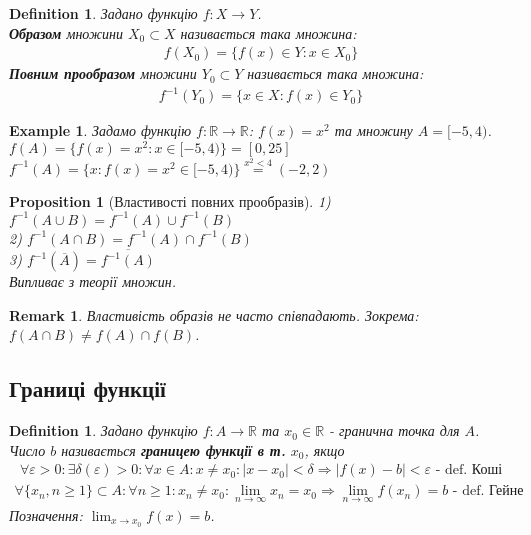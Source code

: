 \documentclass[a4paper, 14pt]{article}
\def\huge{\displaystyle}
\theoremstyle{theoremdd}
\theoremstyle{theoremdd}
\newtheorem{definition}[theorem]{Definition}
\theoremstyle{theoremdd}
\theoremstyle{theoremdd}
\newtheorem{example}[theorem]{Example}
\theoremstyle{theoremdd}
\newtheorem{proposition}[theorem]{Proposition}
\theoremstyle{theoremdd}
\newtheorem{remark}[theorem]{Remark}
\theoremstyle{theoremdd}
\theoremstyle{theoremdd}
\begin{document}
	\begin{definition}
	Задано функцію $f: X \to Y$.\\
	\textbf{Образом} множини $X_0 \subset X$ називається така множина:
	\begin{align*}
	f(X_0) = \{f(x) \in Y: x \in X_0 \}
	\end{align*}
	\textbf{Повним прообразом} множини $Y_0 \subset Y$ називається така множина:
	\begin{align*}
	f^{-1}(Y_0) = \{x \in X:  f(x) \in Y_0 \}
	\end{align*}
	\end{definition}
	
	\begin{example} Задамо функцію $f: \mathbb{R} \to \mathbb{R}$: $f(x) = x^2$ та множину $A = [-5, 4)$.\\
	$f(A) = \{f(x) = x^2: x \in [-5, 4) \} = [0, 25]$\\
	$f^{-1}(A) = \{x: f(x) = x^2 \in [-5, 4) \} \overset{x^2 < 4}{=} (-2, 2)$
	\end{example}
	
	\begin{proposition}[Властивості повних прообразів]
	1) $f^{-1}(A \cup B) = f^{-1}(A) \cup f^{-1}(B)$\\
	2) $f^{-1}(A \cap B) = f^{-1}(A) \cap f^{-1}(B)$\\
	3) $f^{-1}(\overline{A}) = \overline{f^{-1}(A)}$\\
	\textit{Випливає з теорії множин.}
	\end{proposition}
	
	\begin{remark}
	Властивість образів не часто співпадають. Зокрема: $f(A \cap B) \neq f(A) \cap f(B)$.
	\end{remark}
	
	
	\subsection{Границі функції}
	\begin{definition}
	Задано функцію $f: A \to \mathbb{R}$ та $x_0 \in \mathbb{R}$ - гранична точка для $A$.\\
	Число $b$ називається \textbf{границею функції в т.} $x_0$, якщо
	\begin{align*}
	\forall \varepsilon > 0: \exists \delta(\varepsilon) > 0: \forall x \in A: x \neq x_0: |x-x_0|<\delta \Rightarrow |f(x)-b|<\varepsilon \textrm{ - def. Коші}
	\end{align*}
	\begin{align*}
	\forall \{x_n, n \geq 1\}\subset A: \forall n \geq 1: x_n \neq x_0: \lim_{n \to \infty} x_n = x_0 \Rightarrow \lim_{n \to \infty} f(x_n) = b \textrm{ - def. Гейне}
	\end{align*}
	Позначення: $\huge \lim_{x \to x_0} f(x) = b$.
	\end{definition}
	
\end{document}
